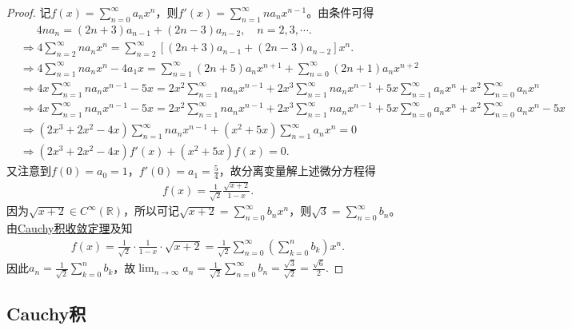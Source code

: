 \documentclass[../../main.tex]{subfiles}
\begin{document}
\begin{proof}
记$f(x) = \sum_{n=0}^{\infty} a_n x^n$，则$f'(x) = \sum_{n=1}^{\infty} n a_n x^{n-1}$。由条件可得
\begin{align*}
&\quad \,\,\, 4n a_n = (2n+3)a_{n-1} + (2n-3)a_{n-2}, \quad n=2,3,\cdots .
\\
&\Rightarrow 4\sum_{n=2}^{\infty} n a_n x^n = \sum_{n=2}^{\infty} \left[ (2n+3)a_{n-1} + (2n-3)a_{n-2} \right] x^n.
\\
&\Rightarrow 4\sum_{n=1}^{\infty} n a_n x^n - 4a_1 x = \sum_{n=1}^{\infty} (2n+5)a_n x^{n+1} + \sum_{n=0}^{\infty} (2n+1)a_n x^{n+2}
\\
&\Rightarrow 4x\sum_{n=1}^{\infty} n a_n x^{n-1} - 5x = 2x^2\sum_{n=1}^{\infty} n a_n x^{n-1} + 2x^3\sum_{n=1}^{\infty} n a_n x^{n-1} + 5x\sum_{n=1}^{\infty} a_n x^n + x^2\sum_{n=0}^{\infty} a_n x^n
\\
&\Rightarrow 4x\sum_{n=1}^{\infty} n a_n x^{n-1} - 5x = 2x^2\sum_{n=1}^{\infty} n a_n x^{n-1} + 2x^3\sum_{n=1}^{\infty} n a_n x^{n-1} + 5x\sum_{n=0}^{\infty} a_n x^n + x^2\sum_{n=0}^{\infty} a_n x^n - 5x
\\
&\Rightarrow (2x^3 + 2x^2 - 4x) \sum_{n=1}^{\infty} n a_n x^{n-1} + (x^2 + 5x) \sum_{n=1}^{\infty} a_n x^n = 0
\\
&\Rightarrow (2x^3 + 2x^2 - 4x) f'(x) + (x^2 + 5x) f(x) = 0.
\end{align*}
又注意到$f(0) = a_0 = 1$，$f'(0) = a_1 = \frac{5}{4}$，故分离变量解上述微分方程得
\begin{align*}
f(x) = \frac{1}{\sqrt{2}} \frac{\sqrt{x+2}}{1-x}.
\end{align*}
因为$\sqrt{x+2} \in C^{\infty}(\mathbb{R})$，所以可记$\sqrt{x+2} = \sum_{n=0}^{\infty} b_n x^n$，则$\sqrt{3} = \sum_{n=0}^{\infty} b_n$。由\hyperref[theorem:Cauchy积收敛定理]{Cauchy积收敛定理}及知
\begin{align*}
f(x) = \frac{1}{\sqrt{2}} \cdot \frac{1}{1-x} \cdot \sqrt{x+2} = \frac{1}{\sqrt{2}} \sum_{n=0}^{\infty} \left( \sum_{k=0}^n b_k \right) x^n.
\end{align*}
因此$a_n = \frac{1}{\sqrt{2}} \sum_{k=0}^n b_k$，故$\lim_{n\rightarrow \infty} a_n = \frac{1}{\sqrt{2}} \sum_{n=0}^{\infty} b_n = \frac{\sqrt{3}}{\sqrt{2}} = \frac{\sqrt{6}}{2}.$
\end{proof}








\subsection{Cauchy积}
\end{document}
